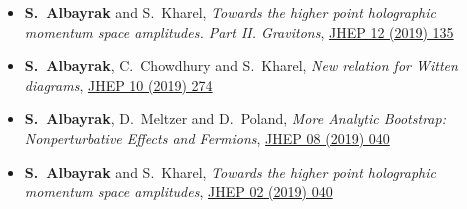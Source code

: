 \documentclass[a4paper,11pt]{article}
\begin{document}
\begin{itemize}
 \item[] {\bf S.~Albayrak} and  { S.~Kharel}, \emph{Towards the higher point holographic momentum space amplitudes. Part II. Gravitons}, \hyperref{https://inspirehep.net/files/eb148d7ad84e19945017f5ab2aa85393}{}{}{JHEP 12 (2019) 135}
 
 \item[] {\bf S.~Albayrak}, C.~Chowdhury and  { S.~Kharel}, \emph{New relation for Witten diagrams}, \hyperref{https://inspirehep.net/files/44b75a5187c14730a849c04e3b909bd3}{}{}{JHEP 10 (2019) 274}
 
 \item[] {\bf S.~Albayrak}, D.~Meltzer and  { D.~Poland}, \emph{More Analytic Bootstrap: Nonperturbative Effects and Fermions}, \hyperref{https://inspirehep.net/files/3a3c45b7b08a2948ba1c165463f00fd0}{}{}{JHEP 08 (2019) 040}
 
 \item[] {\bf S.~Albayrak} and  { S.~Kharel}, \emph{Towards the higher point holographic momentum space amplitudes}, \hyperref{https://inspirehep.net/files/fdfe40b4cfec540b04df94d4cb9bc1c4}{}{}{JHEP 02 (2019) 040}
 \end{itemize}
 
\end{document}
